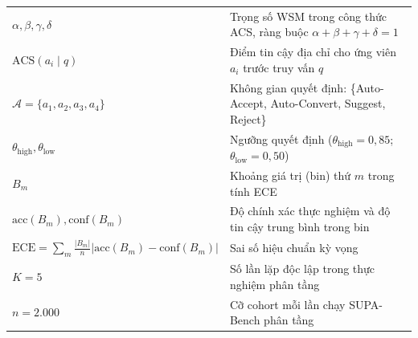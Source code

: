 \begin{longtable}{p{4cm} p{10.4cm}}
$\alpha, \beta, \gamma, \delta$
& Trọng số WSM trong công thức ACS, ràng buộc $\alpha + \beta + \gamma + \delta = 1$ \\

$\mathrm{ACS}(a_i \mid q)$
& Điểm tin cậy địa chỉ cho ứng viên $a_i$ trước truy vấn $q$ \\

$\mathcal{A} = \{a_1, a_2, a_3, a_4\}$
& Không gian quyết định: \{Auto-Accept, Auto-Convert, Suggest, Reject\} \\

$\theta_{\text{high}}, \theta_{\text{low}}$
& Ngưỡng quyết định ($\theta_{\text{high}} = 0{,}85$; $\theta_{\text{low}} = 0{,}50$) \\

$B_m$
& Khoảng giá trị (bin) thứ $m$ trong tính ECE \\

$\mathrm{acc}(B_m), \mathrm{conf}(B_m)$
& Độ chính xác thực nghiệm và độ tin cậy trung bình trong bin \\

$\mathrm{ECE} = \sum_m \tfrac{|B_m|}{n} |\mathrm{acc}(B_m) - \mathrm{conf}(B_m)|$
& Sai số hiệu chuẩn kỳ vọng \\

$K = 5$
& Số lần lặp độc lập trong thực nghiệm phân tầng \\

$n = 2.000$
& Cỡ cohort mỗi lần chạy SUPA-Bench phân tầng \\

\bottomrule
\end{longtable}

\cleardoublepage
